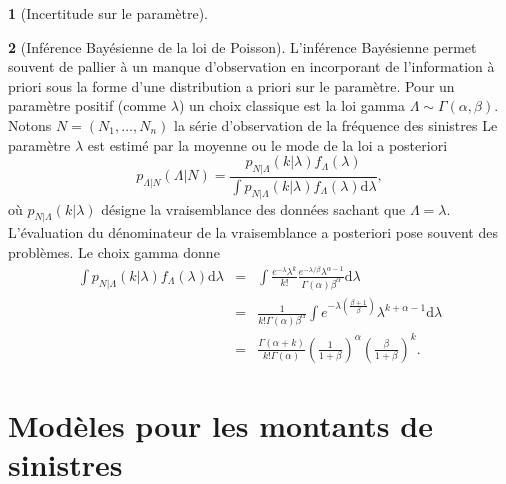 \documentclass[8pt,notheorems]{beamer}
\theoremstyle{definition}
\theoremstyle{example}
\newtheorem{example}{\translate{Example}}
\theoremstyle{mystyle}
\theoremstyle{plain}
\begin{document}
\begin{frame}[allowframebreaks]
\begin{example}[Incertitude sur le paramètre]
 \end{example}
 \begin{example}[Inférence Bayésienne de la loi de Poisson]
 L'inférence Bayésienne permet souvent de pallier à un manque d'observation en incorporant de l'information à priori sous la forme d'une distribution a priori sur le paramètre. Pour un paramètre positif (comme $\lambda$) un choix classique est la loi gamma $\Lambda\sim \Gamma(\alpha, \beta)$. Notons $N=(N_1,\ldots, N_n)$ la série d'observation de la fréquence des sinistres
 Le paramètre $\lambda$ est estimé par la moyenne ou le mode de la loi a posteriori
 $$
 p_{\Lambda|N}(\Lambda|N)=\frac{p_{N|\Lambda}(k|\lambda)f_\Lambda(\lambda)}{\int p_{N|\Lambda}(k|\lambda)f_\Lambda(\lambda)\text{d}\lambda},
 $$
 où $p_{N|\Lambda}(k|\lambda)$ désigne la vraisemblance des données sachant que $\Lambda=\lambda$. L'évaluation du dénominateur de la vraisemblance a posteriori pose souvent des problèmes. Le choix gamma donne
 \begin{eqnarray*}
 \int p_{N|\Lambda}(k|\lambda)f_\Lambda(\lambda)\text{d}\lambda&=&
 \int \frac{e^{-\lambda}\lambda^k}{k!}\frac{e^{-\lambda/\beta}\lambda^{\alpha-1}}{\Gamma(\alpha)\beta^\alpha}\text{d}\lambda\\
 &=&\frac{1}{k!\Gamma(\alpha)\beta^\alpha}\int e^{-\lambda\left(\frac{\beta+1}{\beta}\right)}\lambda^{k+\alpha-1}\text{d}\lambda\\
 &=&\frac{\Gamma(\alpha+k)}{k!\Gamma(\alpha)}\left(\frac{1}{1+\beta}\right)^\alpha\left(\frac{\beta}{1+\beta}\right)^k.
  \end{eqnarray*}

 \end{example}
\end{frame}
\section{Modèles pour les montants de sinistres}
\end{document}
